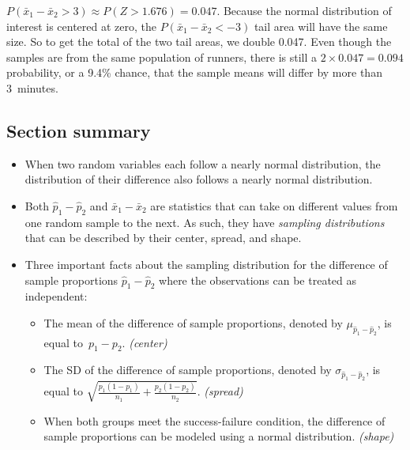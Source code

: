 \begin{examplewrap}
\begin{nexample}
$P(\bar{x}_1-\bar{x}_2>3)\approx P(Z > 1.676) = 0.047$.
Because the normal distribution of interest is centered at zero,
the $P(\bar{x}_1 - \bar{x}_2< -3)$ tail area will have the same size.
So to get the total of the two tail areas, we double 0.047.
Even though the samples are from the same population of runners,
there is still a $2\times 0.047 = 0.094$ probability, or a 9.4\% chance, that the sample means will differ by more than 3~minutes.
\end{nexample}
\end{examplewrap}


\subsection*{Section summary}

\begin{itemize}
\item When two random variables each follow a nearly normal distribution, the distribution of their difference also follows a nearly normal distribution.

\item
  Both $\hat{p}_1-\hat{p}_2$ and $\bar{x}_1-\bar{x}_2$ are
  statistics that can take on different values from one random
  sample to the next.
  As such, they have \emph{sampling distributions} that can be
  described by their center, spread, and shape.

\item Three important facts about the sampling distribution for the difference of sample proportions $\hat{p}_1-\hat{p}_2$ where the observations can be treated as independent:
\begin{itemize}\vspace{-1mm}
  \setlength{\itemsep}{0mm}
  \item The mean of the difference of sample proportions, denoted by $\mu_{\hat{p}_1-\hat{p}_2}$, is equal to~$p_1-p_2$. \textit{(center)}
  \item The SD of the difference of sample proportions, denoted by $\sigma_{\hat{p}_1-\hat{p}_2}$, is equal to $\sqrt{\frac{p_1(1-p_1)}{n_1} + \frac{p_2(1-p_2)}{n_2}}$. \textit{(spread)}
  \item When both groups meet the success-failure condition, the difference of sample proportions can be modeled using a normal distribution. \textit{(shape)}
\end{itemize}



\end{itemize}
